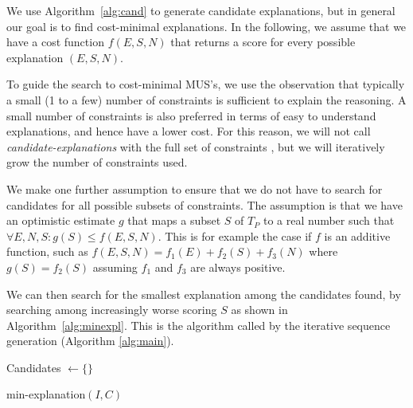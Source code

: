 We use Algorithm~\ref{alg:cand} to generate candidate explanations, but in general our goal is to find cost-minimal explanations. In the following, we assume that we have a cost function $f(E, S, N)$ that returns a score for every possible explanation $(E, S, N)$. 

To guide the search to cost-minimal MUS's, we use the observation that typically a small (1 to a few) number of constraints is sufficient to explain the reasoning. A small number of constraints is also preferred in terms of easy to understand explanations, and hence have a lower cost. For this reason, we will  not call \textit{candidate-explanations} with the full set of constraints \allconstraints, but we will iteratively grow the number of constraints used. 

We make one further assumption to ensure that we do not have to search for candidates for all possible subsets of constraints. The assumption is that we have an optimistic estimate $g$ that maps a subset $S$ of $T_P$ to a real number such that  $\forall E, N, S: g(S) \leq f(E, S, N)$. This is for example the case if $f$ is an additive function, such as $f(E, S, N) = f_1(E) + f_2(S) + f_3(N)$ where $g(S) = f_2(S)$ assuming $f_1$ and $f_3$ are always positive.

We can then search for the smallest explanation among the candidates found, by searching among increasingly worse scoring $S$ as shown in Algorithm~\ref{alg:minexpl}. This is the algorithm called by the iterative sequence generation (Algorithm \ref{alg:main}).

\begin{algorithm}


  Candidates $\gets \{\}$\;
\caption{min-explanation$(I,C)$}
\label{alg:minexpl}
\end{algorithm}

